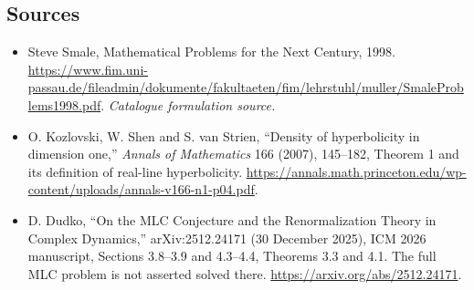 \documentclass[11pt,a4paper]{article}
\begin{document}
\subsection{Sources}
\begin{itemize}\raggedright
\item[\textnormal{[S1]}]\hypertarget{source:30006793:1}{} Steve Smale, Mathematical Problems for the Next Century, 1998.
\url{https://www.fim.uni-passau.de/fileadmin/dokumente/fakultaeten/fim/lehrstuhl/muller/SmaleProblems1998.pdf}.
{\small\textit{Catalogue formulation source.}}
\item[\textnormal{[E1]}]\hypertarget{extra:30006793:1}{} O. Kozlovski, W. Shen and S. van Strien, ``Density of hyperbolicity in dimension one,'' \emph{Annals of Mathematics} 166 (2007), 145--182, Theorem 1 and its definition of real-line hyperbolicity.
\url{https://annals.math.princeton.edu/wp-content/uploads/annals-v166-n1-p04.pdf}.
\item[\textnormal{[E2]}]\hypertarget{extra:30006793:2}{} D. Dudko, ``On the MLC Conjecture and the Renormalization Theory in Complex Dynamics,'' arXiv:2512.24171 (30 December 2025), ICM 2026 manuscript, Sections 3.8--3.9 and 4.3--4.4, Theorems 3.3 and 4.1. The full MLC problem is not asserted solved there.
\url{https://arxiv.org/abs/2512.24171}.
\end{itemize}
\end{document}
